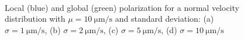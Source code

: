 \documentclass[../../master_thesis_np.tex]{subfiles}
\begin{document}
		\begin{figure}
			\centering
			\ContinuedFloat
			\\
			
			\caption{Local (blue) and global (green) polarization for a normal velocity distribution with $\mu = \SI{10}{\um\per\second}$ and standard deviation: (a) $\sigma = \SI{1}{\um\per\second}$, (b) $\sigma = \SI{2}{\um\per\second}$, (c) $\sigma = \SI{5}{\um\per\second}$, (d) $\sigma = \SI{10}{\um\per\second}$}
			\label{fig:lj_vdist_pol}
		\end{figure}
		
\end{document}
